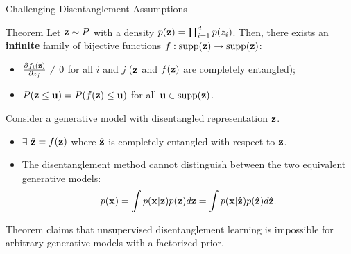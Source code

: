 \begin{frame}{Challenging Disentanglement Assumptions}

\begin{block}{Theorem}
	Let $\mathbf{z} \sim P$ with a density $p(\mathbf{z}) = \prod^d_{i=1} p(z_i)$. Then, there exists an \textbf{infinite} family of bijective functions $f : \text{supp}(\mathbf{z}) \rightarrow \text{supp}(\mathbf{z})$:
	\begin{itemize}
		\item $\frac{\partial f_i(\mathbf{z})}{\partial z_j} \neq 0$ for all $i$ and $j$ ($\mathbf{z}$ and $f(\mathbf{z})$ are completely entangled);
		\item $P(\mathbf{z} \leq \mathbf{u}) = P(f(\mathbf{z}) \leq \mathbf{u})$ for all $\mathbf{u} \in \text{supp}(\mathbf{z})$.
	\end{itemize}  
\end{block}
Consider a generative model with disentangled representation $\mathbf{z}$.
\begin{itemize}
	\item $\exists$ $\hat{\mathbf{z}} = f(\mathbf{z})$ where $\hat{\mathbf{z}}$ is completely entangled
	with respect to $\mathbf{z}$.
	\item The disentanglement method cannot distinguish between the two equivalent generative models:
	\vspace{-0.3cm}
	\[
		p(\mathbf{x}) = \int p(\mathbf{x} | \mathbf{z}) p(\mathbf{z}) d\mathbf{z} = \int p(\mathbf{x} | \hat{\mathbf{z}})p(\hat{\mathbf{z}}) d \hat{\mathbf{z}}.
	\]
\end{itemize}
Theorem claims that unsupervised disentanglement learning is impossible for arbitrary generative models with a factorized prior.

\end{frame}
